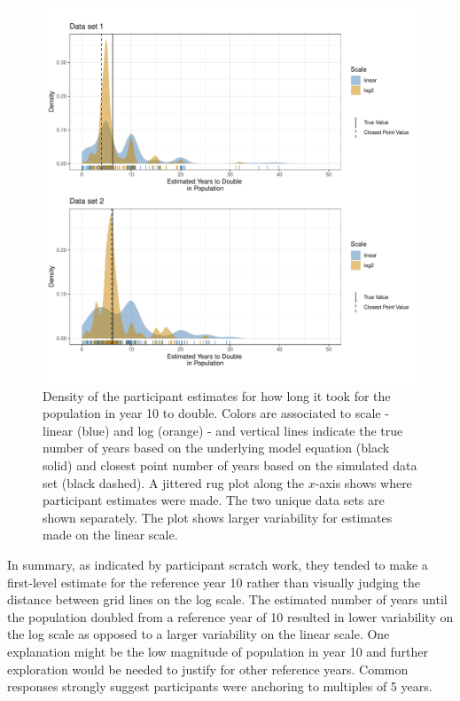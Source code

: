 \documentclass[print]{nuthesis}
\begin{document}
\begin{figure}[tbp]

{\centering \includegraphics[width=1\linewidth,]{thesis_files/figure-latex/qi3-density-1} 

}

\caption[Intermediate Q3 density]{Density of the participant estimates for how long it took for the population in year 10 to double. Colors are associated to scale - linear (blue) and log (orange) - and vertical lines indicate the true number of years based on the underlying model equation (black solid) and closest point number of years based on the simulated data set (black dashed). A jittered rug plot along the $x$-axis shows where participant estimates were made. The two unique data sets are shown separately. The plot shows larger variability for estimates made on the linear scale.}\label{fig:qi3-density}
\end{figure}

In summary, as indicated by participant scratch work, they tended to make a first-level estimate for the reference year 10 rather than visually judging the distance between grid lines on the log scale.
The estimated number of years until the population doubled from a reference year of 10 resulted in lower variability on the log scale as opposed to a larger variability on the linear scale.
One explanation might be the low magnitude of population in year 10 and further exploration would be needed to justify for other reference years.
Common responses strongly suggest participants were anchoring to multiples of 5 years.
\end{document}
